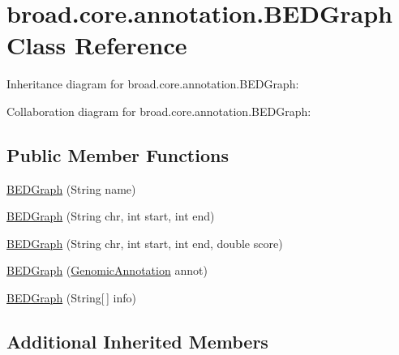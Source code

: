 \hypertarget{classbroad_1_1core_1_1annotation_1_1_b_e_d_graph}{\section{broad.\+core.\+annotation.\+B\+E\+D\+Graph Class Reference}
\label{classbroad_1_1core_1_1annotation_1_1_b_e_d_graph}
}


Inheritance diagram for broad.\+core.\+annotation.\+B\+E\+D\+Graph\+:


Collaboration diagram for broad.\+core.\+annotation.\+B\+E\+D\+Graph\+:
\subsection*{Public Member Functions}
\begin{DoxyCompactItemize}
\item 
\hyperlink{classbroad_1_1core_1_1annotation_1_1_b_e_d_graph_accbaae0809c6fade126ef8cceaa806b9}{B\+E\+D\+Graph} (String name)
\item 
\hyperlink{classbroad_1_1core_1_1annotation_1_1_b_e_d_graph_a3e2ca9ab0a6795ac8ff4ab5b8ae6d24c}{B\+E\+D\+Graph} (String chr, int start, int end)
\item 
\hyperlink{classbroad_1_1core_1_1annotation_1_1_b_e_d_graph_ab0a6299a368206fb375aff65b32b9369}{B\+E\+D\+Graph} (String chr, int start, int end, double score)
\item 
\hyperlink{classbroad_1_1core_1_1annotation_1_1_b_e_d_graph_aac8d3d3306b6cec5bca3520183b14585}{B\+E\+D\+Graph} (\hyperlink{interfacebroad_1_1core_1_1annotation_1_1_genomic_annotation}{Genomic\+Annotation} annot)
\item 
\hyperlink{classbroad_1_1core_1_1annotation_1_1_b_e_d_graph_a24b64effbca3c96edb4fa59ff9ec673a}{B\+E\+D\+Graph} (String\mbox{[}$\,$\mbox{]} info)
\end{DoxyCompactItemize}
\subsection*{Additional Inherited Members}


